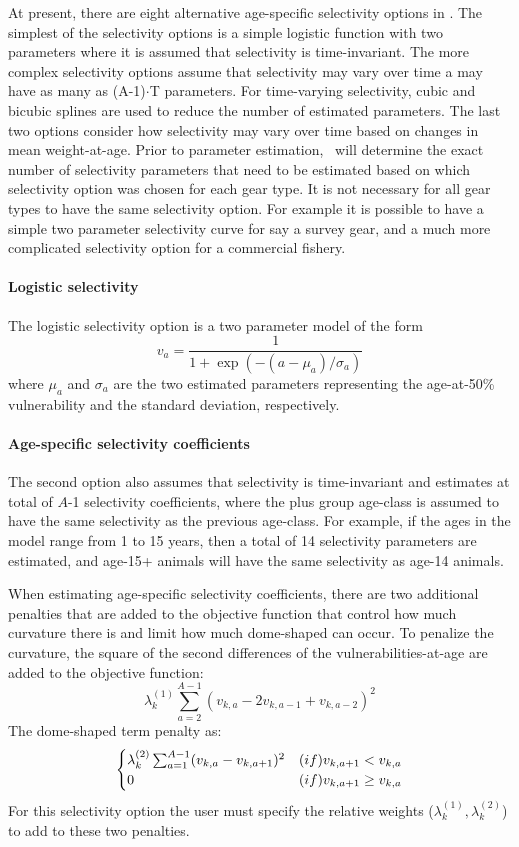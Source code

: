 At present, there are eight alternative age-specific selectivity options in \iscam.  The simplest of the selectivity options is a simple logistic function with two parameters where it is assumed that selectivity is time-invariant.  The more complex selectivity options assume that selectivity may vary over time a may have as many as (A-1)$\cdot$T parameters.  For time-varying selectivity, cubic and bicubic splines are used to reduce the number of estimated parameters. The last two options consider how selectivity may vary over time based on changes in mean weight-at-age. Prior to parameter estimation, \iscam\ will determine the exact number of selectivity parameters that need to be estimated based on which selectivity option was chosen for each gear type.  It is not necessary for all gear types to have the same selectivity option.  For example it is possible to have a simple two parameter selectivity curve for say a survey gear, and a much more complicated selectivity option for a commercial fishery.

\paragraph{Logistic selectivity} 
The logistic selectivity option is a two parameter model of the form
\[
v_a = \frac{1}{1+ \exp{(-(a-\mu_{a})/\sigma_a)}}
\]
where $\mu_a$ and $\sigma_a$ are the two estimated parameters representing the age-at-50\% vulnerability and the standard deviation, respectively.

\paragraph{Age-specific selectivity coefficients}
The second option also assumes that selectivity is time-invariant and estimates at total of $A$-1 selectivity coefficients, where the plus group age-class is assumed to have the same selectivity as the previous age-class.  For example, if the ages in the model range from 1 to 15 years, then a total of 14 selectivity parameters are estimated, and age-15+ animals will have the same selectivity as age-14 animals.

When estimating age-specific selectivity coefficients, there are two additional penalties that are added to the objective function that control how much curvature there is and limit how much dome-shaped can occur.  To penalize the curvature, the square of the second differences of the vulnerabilities-at-age are added to the objective function: 
\begin{equation}\label{eq2ndDiff}
\lambda_k^{(1)} \sum_{a=2}^{A-1}(v_{k,a} - 2v_{k,a-1} + v_{k,a-2})^2
\end{equation}
The dome-shaped term penalty as:
\begin{equation}\label{eqDomePenalty}
\begin{cases}
\lambda_k^{(2)} \sum_{a=1}^{A-1}(v_{k,a} - v_{k,a+1})^2& \mbox(if) v_{k,a+1}< v_{k,a}\\
0 & \mbox(if) v_{k,a+1}\geq v_{k,a}
\end{cases}
\end{equation}
For this selectivity option the user must specify the relative weights ($\lambda_k^{(1)},\lambda_k^{(2)}$) to add to these two penalties.

